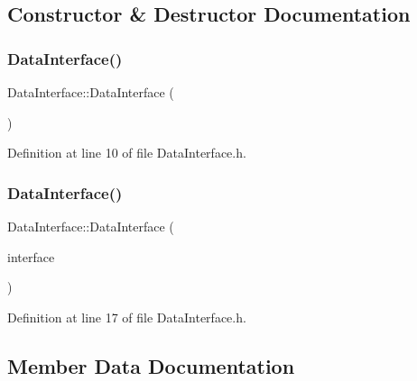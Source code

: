 \subsection{Constructor \& Destructor Documentation}
\mbox{\label{struct_data_interface_a6c52feeda005b02d5172573c7c4d4a24}} 
\subsubsection{\texorpdfstring{Data\+Interface()}{DataInterface()}\hspace{0.1cm}{\footnotesize\ttfamily [1/2]}}
{\footnotesize\ttfamily Data\+Interface\+::\+Data\+Interface (\begin{DoxyParamCaption}{ }\end{DoxyParamCaption})\hspace{0.3cm}{\ttfamily [inline]}}



Definition at line 10 of file Data\+Interface.\+h.

\mbox{\label{struct_data_interface_a4e1adf6b36493994157224248beacf85}} 
\subsubsection{\texorpdfstring{Data\+Interface()}{DataInterface()}\hspace{0.1cm}{\footnotesize\ttfamily [2/2]}}
{\footnotesize\ttfamily Data\+Interface\+::\+Data\+Interface (\begin{DoxyParamCaption}\item[{const \mbox{\hyperlink{struct_data_interface}{Data\+Interface}} \&}]{interface }\end{DoxyParamCaption})\hspace{0.3cm}{\ttfamily [inline]}}



Definition at line 17 of file Data\+Interface.\+h.



\subsection{Member Data Documentation}
\mbox{\label{struct_data_interface_a861c2689215956b596d6f1e9d279dd94}} 
